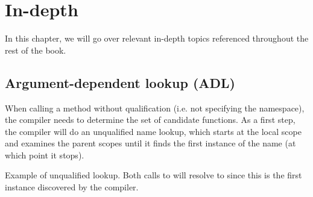 \chapter{In-depth}

In this chapter, we will go over relevant in-depth topics referenced throughout the rest of the book.

\section{Argument-dependent lookup (ADL)}

When calling a method without qualification (i.e. not specifying the namespace), the compiler needs to determine the set of candidate functions. As a first step, the compiler will do an unqualified name lookup, which starts at the local scope and examines the parent scopes until it finds the first instance of the name (at which point it stops).

\begin{box-note}
\footnotesize Example of unqualified lookup. Both calls to  will resolve to  since this is the first instance discovered by the compiler.
\tcblower
{}
\end{box-note}